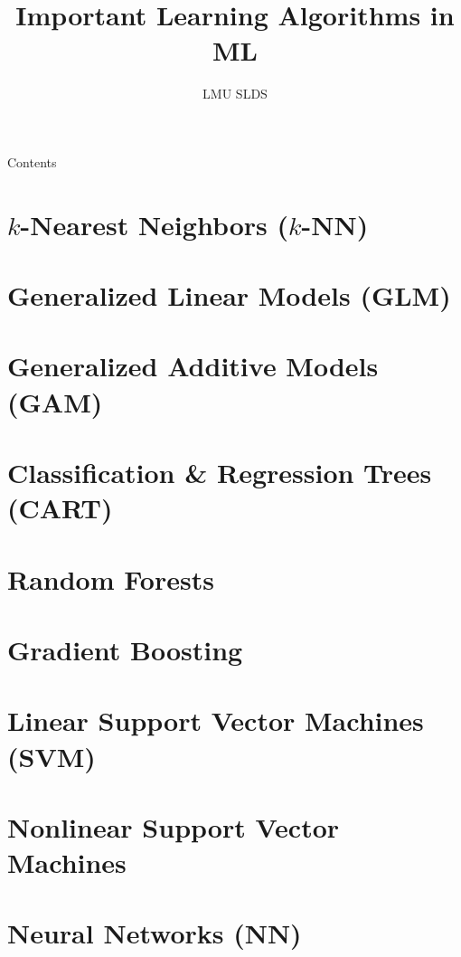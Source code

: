 \documentclass[11pt, t, aspectratio=169]{beamer}
\title{Important Learning Algorithms in ML}
\institute{\href{https://compstat-lmu.github.io/lecture_i2ml/}{
compstat-lmu.github.io/lecture\_i2ml}}
\author{LMU SLDS}
\date{}
\begin{document}
\lecturechapter{}

\begin{frame}{Contents}
  \tableofcontents
\end{frame}

\footnotesize


\section{$k$-Nearest Neighbors ($k$-NN)}


\section{Generalized Linear Models (GLM)}


% 

\section{Generalized Additive Models (GAM)}


\section{Classification \& Regression Trees (CART)}


\section{Random Forests}


\section{Gradient Boosting}


\section{Linear Support Vector Machines (SVM)}


\section{Nonlinear Support Vector Machines}


% 

\section{Neural Networks (NN)}


\endlecture
\end{document}
